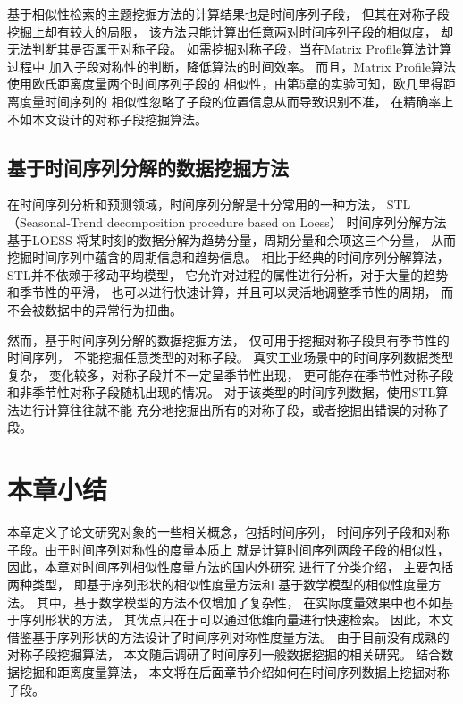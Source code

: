 基于相似性检索的主题挖掘方法的计算结果也是时间序列子段，
但其在对称子段挖掘上却有较大的局限，
该方法只能计算出任意两对时间序列子段的相似度，
却无法判断其是否属于对称子段。
如需挖掘对称子段，当在Matrix Profile算法计算过程中
加入子段对称性的判断，降低算法的时间效率。
而且，Matrix Profile算法使用欧氏距离度量两个时间序列子段的
相似性，由第5章的实验可知，欧几里得距离度量时间序列的
相似性忽略了子段的位置信息从而导致识别不准，
在精确率上不如本文设计的对称子段挖掘算法。

\subsection{基于时间序列分解的数据挖掘方法}
在时间序列分析和预测领域，时间序列分解是十分常用的一种方法，
STL（Seasonal-Trend decomposition procedure based on Loess）\cite{DBLP:conf/www/BayardoMS07}
时间序列分解方法基于LOESS\cite{DBLP:books/lib/HastieTF09}
将某时刻的数据分解为趋势分量，周期分量和余项这三个分量，
从而挖掘时间序列中蕴含的周期信息和趋势信息。
相比于经典的时间序列分解算法，STL并不依赖于移动平均模型，
它允许对过程的属性进行分析，对于大量的趋势和季节性的平滑，
也可以进行快速计算，并且可以灵活地调整季节性的周期，
而不会被数据中的异常行为扭曲。

然而，基于时间序列分解的数据挖掘方法，
仅可用于挖掘对称子段具有季节性的时间序列，
不能挖掘任意类型的对称子段。
真实工业场景中的时间序列数据类型复杂，
变化较多，对称子段并不一定呈季节性出现，
更可能存在季节性对称子段和非季节性对称子段随机出现的情况。
对于该类型的时间序列数据，使用STL算法进行计算往往就不能
充分地挖掘出所有的对称子段，或者挖掘出错误的对称子段。

\section{本章小结}
本章定义了论文研究对象的一些相关概念，包括时间序列，
时间序列子段和对称子段。由于时间序列对称性的度量本质上
就是计算时间序列两段子段的相似性，
因此，本章对时间序列相似性度量方法的国内外研究
进行了分类介绍，
主要包括两种类型，
即基于序列形状的相似性度量方法和
基于数学模型的相似性度量方法。
其中，基于数学模型的方法不仅增加了复杂性，
在实际度量效果中也不如基于序列形状的方法，
其优点只在于可以通过低维向量进行快速检索。
因此，本文借鉴基于序列形状的方法设计了时间序列对称性度量方法。
由于目前没有成熟的对称子段挖掘算法，
本文随后调研了时间序列一般数据挖掘的相关研究。
结合数据挖掘和距离度量算法，
本文将在后面章节介绍如何在时间序列数据上挖掘对称子段。